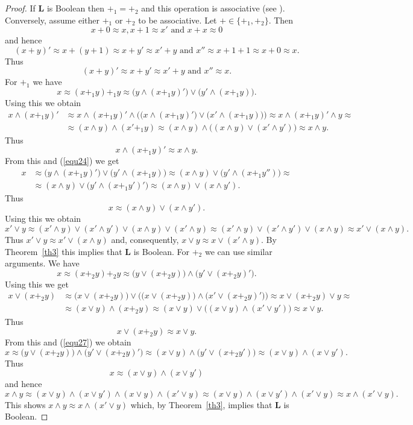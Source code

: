 \documentclass[12pt]{article}
\begin{document}
\begin{proof}
If $\mathbf L$ is Boolean then $+_1=+_2$ and this operation is associative (see \cite{B79}). Conversely, assume either $+_1$ or $+_2$ to be associative. Let $+\in\{+_1,+_2\}$. Then
\[
x+0\approx x, x+1\approx x'\text{ and }x+x\approx0
\]
and hence
\[
(x+y)'\approx x+(y+1)\approx x+y'\approx x'+y\text{ and }x''\approx x+1+1\approx x+0\approx x.
\]
Thus
\[
(x+y)'\approx x+y'\approx x'+y\text{ and }x''\approx x.
\]
For $+_1$ we have
\begin{equation}\label{equ24}
x\approx(x+_1y)+_1y\approx\big(y\wedge(x+_1y)'\big)\vee\big(y'\wedge(x+_1y)\big).
\end{equation}
Using this we obtain
\begin{align*}
x\wedge(x+_1y)' & \approx x\wedge(x+_1y)'\wedge\Big(\big(x\wedge(x+_1y)'\big)\vee\big(x'\wedge(x+_1y)\big)\Big)\approx x\wedge(x+_1y)'\wedge y\approx \\
                & \approx(x\wedge y)\wedge(x'+_1y)\approx(x\wedge y)\wedge\big((x\wedge y)\vee(x'\wedge y')\big)\approx x\wedge y.
\end{align*}
Thus
\[
x\wedge(x+_1y)'\approx x\wedge y.
\]
From this and (\ref{equ24}) we get
\begin{align*}
x & \approx\big(y\wedge(x+_1y)'\big)\vee\big(y'\wedge(x+_1y)\big)\approx(x\wedge y)\vee\big(y'\wedge(x+_1y'')\big)\approx \\
  & \approx(x\wedge y)\vee\big(y'\wedge(x+_1y')'\big)\approx(x\wedge y)\vee(x\wedge y').
\end{align*}
Thus
\[
x\approx(x\wedge y)\vee(x\wedge y').
\]
Using this we obtain
\[
x'\vee y\approx(x'\wedge y)\vee(x'\wedge y')\vee(x\wedge y)\vee(x'\wedge y)\approx(x'\wedge y)\vee(x'\wedge y')\vee(x\wedge y)\approx x'\vee(x\wedge y).	
\]
Thus $x'\vee y\approx x'\vee(x\wedge y)$ and, consequently, $x\vee y\approx x\vee(x'\wedge y)$. By Theorem~\ref{th3} this implies that $\mathbf L$ is Boolean. For $+_2$ we can use similar arguments. We have
\begin{equation}\label{equ27}
x\approx(x+_2y)+_2y\approx\big(y\vee(x+_2y)\big)\wedge\big(y'\vee(x+_2y)'\big).
\end{equation}	
Using this we get
\begin{align*}
x\vee(x+_2y) & \approx\big(x\vee(x+_2y)\big)\vee\Big(\big(x\vee(x+_2y)\big)\wedge\big(x'\vee(x+_2y)'\big)\Big)\approx x\vee(x+_2y)\vee y\approx \\
& \approx(x\vee y)\wedge(x+_2y)\approx(x\vee y)\vee\big((x\vee y)\wedge(x'\vee y')\big)\approx x\vee y.	
\end{align*}
Thus
\[
x\vee(x+_2y)\approx x\vee y.
\]
From this and (\ref{equ27}) we obtain
\[
x\approx\big(y\vee(x+_2y)\big)\wedge\big(y'\vee(x+_2y)'\big)\approx(x\vee y)\wedge\big(y'\vee(x+_2 y')\big)\approx(x\vee y)\wedge(x\vee y').
\]
Thus
\[
x\approx(x\vee y)\wedge(x\vee y')
\]
and hence
\[
x\wedge y\approx(x\vee y)\wedge(x\vee y')\wedge(x\vee y)\wedge(x'\vee y)\approx(x\vee y)\wedge(x\vee y')\wedge(x'\vee y)\approx x\wedge(x'\vee y).
\]
This shows $x\wedge y\approx x\wedge(x'\vee y)$ which, by Theorem~\ref{th3}, implies that $\mathbf L$ is Boolean.
\end{proof}
\end{document}

